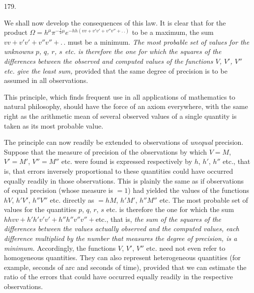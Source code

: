\begin{center}\hypertarget{native-251-article179}{}179.\end{center}
We shall now develop the consequences of this law. It is clear that for the product $\Omega=h^\mu\pi^{-\frac{1}{2}\mu}e^{-hh(vv+v'v'+v''v''+\mathord{.}\,\mathord{.})}$ to be a maximum, the sum $vv+v'v'+v''v''+\mathord{.}\,\mathord{.}$ must be a minimum. \emph{The most probable set of values for the unknowns $p$, $q$, $r$, $s$ etc. is therefore the one for which the squares of the differences between the observed and computed values of the functions $V$, $V'$, $V''$ etc. give the least sum,} provided that the same degree of precision is to be assumed in all observations.

This principle, which finds frequent use in all applications of mathematics to natural philosophy, should have the force of an axiom everywhere, with the same right as the arithmetic mean of several observed values of a single quantity is taken as its most probable value.

The principle can now readily be extended to observations of \emph{unequal} precision. Suppose that the measure of precision of the observations by which $V=M$, $V'=M'$, $V''=M''$ etc. were found is expressed respectively by $h$, $h'$, $h''$ etc., that is, that errors inversely proportional to these quantities could have occurred equally readily in those observations. This is plainly the same as if observations of equal precision (whose measure is $=1$) had yielded the values of the functions $hV$, $h'V'$, $h''V''$ etc. directly as $=hM$, $h'M'$, $h''M''$ etc. The most probable set of values for the quantities $p$, $q$, $r$, $s$ etc. is therefore the one for which the sum $hhvv+h'h'v'v'+h''h''v''v''+\text{etc.}$, that is, \emph{the sum of the squares of the differences between the values actually observed and the computed values, each difference multiplied by the number that measures the degree of precision, is a minimum.} Accordingly, the functions $V$, $V'$, $V''$ etc. need not even refer to homogeneous quantities. They can also represent heterogeneous quantities (for example, seconds of arc and seconds of time), provided that we can estimate the ratio of the errors that could have occurred equally readily in the respective observations.
